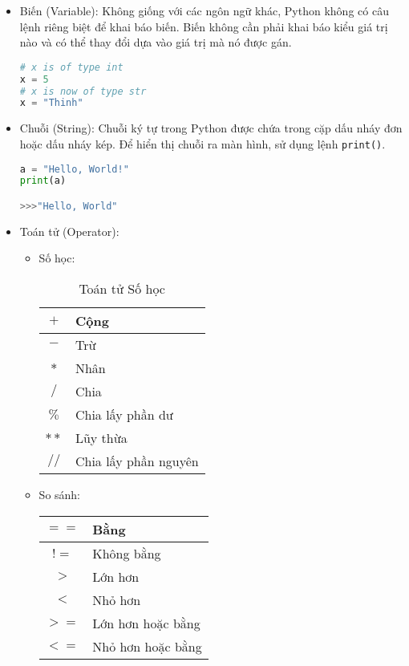 \begin{itemize}
	\item Biến (Variable): Không giống với các ngôn ngữ khác, Python không có câu lệnh riêng biệt để khai báo biến. Biến không cần phải khai báo kiểu giá trị nào và có thể thay đổi dựa vào giá trị mà nó được gán.
	\begin{lstlisting}[language=Python]
# x is of type int
x = 5
# x is now of type str
x = "Thinh"
	\end{lstlisting}
	\item Chuỗi (String): Chuỗi ký tự trong Python được chứa trong cặp dấu nháy đơn hoặc dấu nháy kép. Để hiển thị chuỗi ra màn hình, sử dụng lệnh \texttt{print()}.
	\begin{lstlisting}[language=Python]
a = "Hello, World!"
print(a)

>>>"Hello, World"
	\end{lstlisting}
	\item Toán tử (Operator):
	\begin{itemize}
		\item Số học:
		\begin{table}[!ht]
			\centering
			\begin{tabular}{|c|l|}
				\hline
				$+$ & Cộng\\
				\hline
				$-$ & Trừ\\
				\hline
				$*$ & Nhân\\
				\hline
				$/$ & Chia\\
				\hline
				$\%$ & Chia lấy phần dư\\
				\hline
				$**$ & Lũy thừa\\
				\hline
				$//$ & Chia lấy phần nguyên\\
				\hline
			\end{tabular}
			\caption{Toán tử Số học}
		\end{table}
		\item So sánh:
		\begin{table}[!ht]
			\centering
			\begin{tabular}{|c|l|}
				\hline
				$==$ & Bằng\\
				\hline
				$!=$ & Không bằng\\
				\hline
				$>$ & Lớn hơn\\
				\hline
				$<$ & Nhỏ hơn\\
				\hline
				$>=$ & Lớn hơn hoặc bằng\\
				\hline
				$<=$ & Nhỏ hơn hoặc bằng\\
				\hline
			\end{tabular}

\end{table}
\end{itemize}
\end{itemize}
